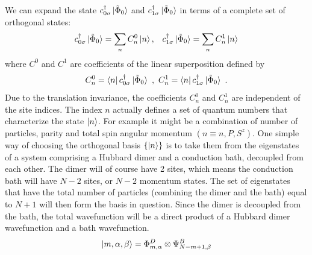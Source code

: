 \documentclass[12pt]{article}
\numberwithin{equation}{section}
\begin{document}
We can expand the state $c^\dagger_{0\sigma}\ket{\tilde \Phi_0}$ and $c^\dagger_{1\sigma}\ket{\tilde \Phi_0}$ in terms of a complete set of orthogonal states:
\begin{equation}\begin{aligned}
	c^\dagger_{0\sigma}\ket{\tilde \Phi_0} = \sum_n C^0_n \ket{n}, && c^\dagger_{1\sigma}\ket{\tilde \Phi_0} = \sum_n C^1_n \ket{n}%
\end{aligned}\end{equation}
where $C^{0}$ and $C^{1}$ are coefficients of the linear superposition defined by
\begin{equation}
C^{0}_{n} = \bra{n} c^\dagger_{0\sigma}\ket{\tilde \Phi_0}~,~ C^{1}_{n} = \bra{n} c^\dagger_{1\sigma}\ket{\tilde \Phi_0}~.
\end{equation}
Due to the translation invariance, the coefficients $C^{0}_{n}$ and $C^{1}_{n}$ are independent of the site indices. The index $n$ actually defines a set of quantum numbers that characterize the state $\ket{n}$. For example it might be a combination of number of particles, parity and total spin angular momentum $(n \equiv n, P, S^z)$. One simple way of choosing the orthogonal basis $\left\{ \ket{n} \right\}$ is to take them from the eigenstates of a system comprising a Hubbard dimer and a conduction bath, decoupled from each other. The dimer will of course have 2 sites, which means the conduction bath will have $N-2$ sites, or $N-2$ momentum states. The set of eigenstates that have the total number of particles (combining the dimer and the bath) equal to $N+1$ will then form the basis in question. Since the dimer is decoupled from the bath, the total wavefunction will be a direct product of a Hubbard dimer wavefunction and a bath wavefunction.
\begin{equation}\begin{aligned}
	\ket{m,\alpha,\beta} = \Phi^D_{m,\alpha} \otimes \Psi^B_{N-m+1, \beta}
\end{aligned}\end{equation}
\end{document}
